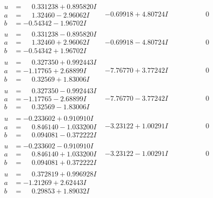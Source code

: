 \documentclass[1p]{elsarticle_modified}
\theoremstyle{definition}
\begin{document}
$$\begin{array}{c|c|c}
\begin{aligned}
u &= \phantom{-}0.331238 + 0.895820 I \\
a &= \phantom{-}1.32460 - 2.96062 I \\
b &= -0.54342 - 1.96702 I\end{aligned}
 & -0.69918 + 4.80724 I & \phantom{-0.000000 } 0 \\ \hline\begin{aligned}
u &= \phantom{-}0.331238 - 0.895820 I \\
a &= \phantom{-}1.32460 + 2.96062 I \\
b &= -0.54342 + 1.96702 I\end{aligned}
 & -0.69918 - 4.80724 I & \phantom{-0.000000 } 0 \\ \hline\begin{aligned}
u &= \phantom{-}0.327350 + 0.992443 I \\
a &= -1.17765 + 2.68899 I \\
b &= \phantom{-}0.32569 + 1.83006 I\end{aligned}
 & -7.76770 + 3.77242 I & \phantom{-0.000000 } 0 \\ \hline\begin{aligned}
u &= \phantom{-}0.327350 - 0.992443 I \\
a &= -1.17765 - 2.68899 I \\
b &= \phantom{-}0.32569 - 1.83006 I\end{aligned}
 & -7.76770 - 3.77242 I & \phantom{-0.000000 } 0 \\ \hline\begin{aligned}
u &= -0.233602 + 0.910910 I \\
a &= \phantom{-}0.846140 - 1.033200 I \\
b &= \phantom{-}0.094081 - 0.372222 I\end{aligned}
 & -3.23122 + 1.00291 I & \phantom{-0.000000 } 0 \\ \hline\begin{aligned}
u &= -0.233602 - 0.910910 I \\
a &= \phantom{-}0.846140 + 1.033200 I \\
b &= \phantom{-}0.094081 + 0.372222 I\end{aligned}
 & -3.23122 - 1.00291 I & \phantom{-0.000000 } 0 \\ \hline\begin{aligned}
u &= \phantom{-}0.372819 + 0.996928 I \\
a &= -1.21269 + 2.62443 I \\
b &= \phantom{-}0.29853 + 1.89032 I\end{aligned}

\end{array}$$
\end{document}

